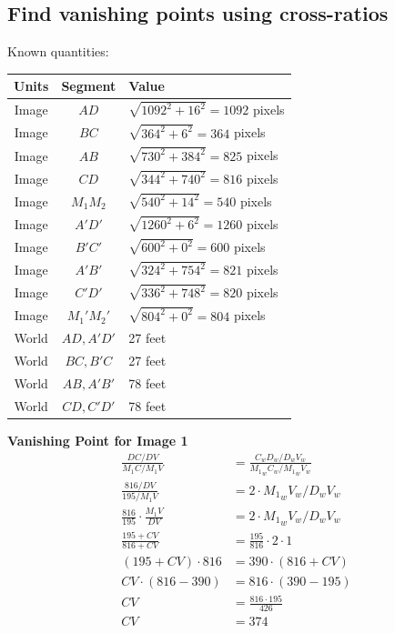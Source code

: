 \documentclass[12pt, oneside]{article}
\begin{document}
\subsection{Find vanishing points using cross-ratios}

Known quantities:
\begin{table}[H]
\centering
\begin{tabular}{|c|c|l|}
\hline
\multicolumn{1}{|l|}{\textbf{Units}} & \textbf{Segment} & \textbf{Value}  \\ \hline
Image & $AD$      & $\sqrt{1092^2 + 16^2} = 1092$ pixels     \\ \hline
Image & $BC$      & $\sqrt{364^2 + 6^2} = 364$ pixels       \\ \hline
Image & $AB$      & $\sqrt{730^2 + 384^2} = 825$ pixels     \\ \hline
Image & $CD$      & $\sqrt{344^2 + 740^2} = 816$ pixels     \\ \hline
Image & $M_1 M_2$ & $\sqrt{540^2 + 14^2} = 540$ pixels     \\ \hline
Image & $A'D'$      & $\sqrt{1260^2 + 6^2} = 1260$ pixels     \\ \hline
Image & $B'C'$      & $\sqrt{600^2 + 0^2} = 600$ pixels       \\ \hline
Image & $A'B'$      & $\sqrt{324^2 + 754^2} = 821$ pixels     \\ \hline
Image & $C'D'$      & $\sqrt{336^2 + 748^2} = 820$ pixels     \\ \hline
Image & $M_1' M_2'$ & $\sqrt{804^2 + 0^2} = 804$ pixels     \\ \hline
World & $AD, A'D'$      & 27 feet     \\ \hline
World & $BC, B'C$       & 27 feet     \\ \hline
World & $AB, A'B'$      & 78 feet     \\ \hline
World & $CD, C'D'$      & 78 feet     \\ \hline
\end{tabular}
\end{table}

\textbf{Vanishing Point for Image 1}
\begin{align*}
  \frac{DC/DV}{{M_1}C/M_1V} &= \frac{C_wD_w/D_wV_w}{{M_1}_wC_w/{M_1}_wV_w} \\
  \frac{816/DV}{195/M_1V}                 &= 2 \cdot {M_1}_wV_w/D_wV_w \\
  \frac{816}{195}\cdot \frac{M_1V}{DV}    &= 2 \cdot {M_1}_wV_w/D_wV_w \\
  \frac{195 + CV}{816 + CV}   &= \frac{195}{816}\cdot 2 \cdot 1 \\
  (195 + CV) \cdot 816   &= 390 \cdot (816 + CV) \\
  CV \cdot (816 - 390)   &= 816 \cdot (390 - 195)\\
  CV  &= \frac{816 \cdot 195} {426}\\
  CV  &= 374\\
\end{align*}
\end{document}
